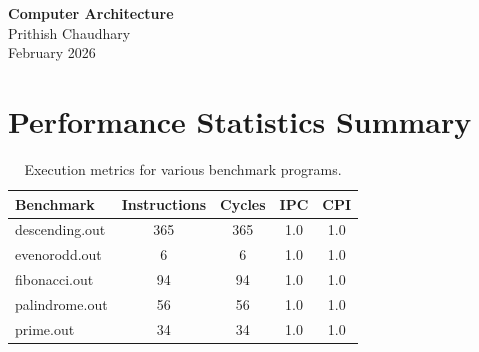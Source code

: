 \documentclass[12pt]{article}
\begin{document}
\begin{center}
    {\Large \textbf{Computer Architecture}}\\[0.5cm]
    Prithish Chaudhary\\[0.2cm]
    February 2026
\end{center}

\vspace{0.8cm}

\section*{Performance Statistics Summary}

\begin{table}[h]
    \centering
    \renewcommand{\arraystretch}{1.5} %
    \begin{tabular}{@{}lcccc@{}}
        \toprule
        \textbf{Benchmark} & \textbf{Instructions} & \textbf{Cycles} & \textbf{IPC} & \textbf{CPI} \\ 
        \midrule
        descending.out     & 365                   & 365             & 1.0          & 1.0          \\
        evenorodd.out      & 6                     & 6               & 1.0          & 1.0          \\
        fibonacci.out      & 94                    & 94              & 1.0          & 1.0          \\
        palindrome.out     & 56                    & 56              & 1.0          & 1.0          \\
        prime.out          & 34                    & 34              & 1.0          & 1.0          \\ 
        \bottomrule
    \end{tabular}
    \caption{Execution metrics for various benchmark programs.}
    \label{tab:metrics}
\end{table}
\end{document}
